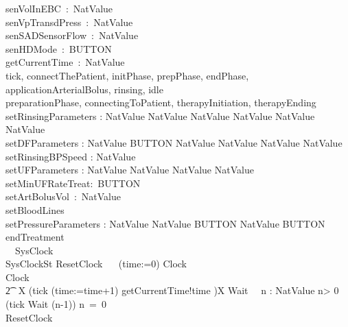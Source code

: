 \begin{circus}
  \circchannel senVolInEBC~:~NatValue\\
  \circchannel senVpTransdPress~:~NatValue\\
  \circchannel senSADSensorFlow~:~NatValue\\
  \circchannel senHDMode~:~BUTTON\\
  \circchannel getCurrentTime~:~NatValue\\
  \circchannel tick, connectThePatient, initPhase, prepPhase, endPhase, applicationArterialBolus, rinsing, idle\\
  \circchannel preparationPhase, connectingToPatient, therapyInitiation, therapyEnding\\
  \circchannel setRinsingParameters : NatValue \cross NatValue \cross NatValue \cross NatValue \cross NatValue \cross NatValue\\
  \circchannel setDFParameters : NatValue \cross BUTTON \cross NatValue \cross NatValue \cross NatValue \cross NatValue\\
  \circchannel setRinsingBPSpeed : NatValue\\
  \circchannel setUFParameters : NatValue \cross NatValue \cross NatValue \cross NatValue\\
  \circchannel setMinUFRateTreat:~BUTTON\\
  \circchannel setArtBolusVol~:~NatValue\\
  \circchannel setBloodLines\\
  \circchannel setPressureParameters : NatValue \cross NatValue \cross BUTTON \cross NatValue \cross BUTTON\\
  \circchannel endTreatment\\
\circprocess\ ~SysClock ~\circdef~\circbegin\\
\circstate SysClockSt 
  ResetClock ~\circdef~ (time:=0) \circseq Clock\\
  Clock ~\circdef~
  \\\t2 \circmu~X \circspot  (tick \then (time:=time+1) \interleave getCurrentTime!time \then \Skip)\circseq X
  Wait~\circdef~ \circvar n : NatValue \circspot
   \circif n> 0 \circthen (tick \then Wait (n-1))
   \circelse n~=~0 \circthen \Skip
   \circfi\\
  \circspot ResetClock
  \circend
\end{circus}
